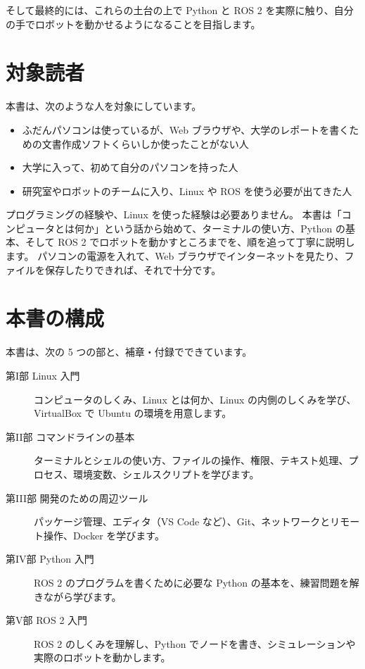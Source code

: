 そして最終的には、これらの土台の上で Python と ROS 2 を実際に触り、自分の手でロボットを動かせるようになることを目指します。

\section*{対象読者}

本書は、次のような人を対象にしています。

\begin{itemize}
  \item ふだんパソコンは使っているが、Web ブラウザや、大学のレポートを書くための文書作成ソフトくらいしか使ったことがない人
  \item 大学に入って、初めて自分のパソコンを持った人
  \item 研究室やロボットのチームに入り、Linux や ROS を使う必要が出てきた人
\end{itemize}

プログラミングの経験や、Linux を使った経験は必要ありません。
本書は「コンピュータとは何か」という話から始めて、ターミナルの使い方、Python の基本、そして ROS 2 でロボットを動かすところまでを、順を追って丁寧に説明します。
パソコンの電源を入れて、Web ブラウザでインターネットを見たり、ファイルを保存したりできれば、それで十分です。

\section*{本書の構成}

本書は、次の 5 つの部と、補章・付録でできています。

\begin{description}
  \item[第I部 Linux 入門] コンピュータのしくみ、Linux とは何か、Linux の内側のしくみを学び、VirtualBox で Ubuntu の環境を用意します。
  \item[第II部 コマンドラインの基本] ターミナルとシェルの使い方、ファイルの操作、権限、テキスト処理、プロセス、環境変数、シェルスクリプトを学びます。
  \item[第III部 開発のための周辺ツール] パッケージ管理、エディタ（VS Code など）、Git、ネットワークとリモート操作、Docker を学びます。
  \item[第IV部 Python 入門] ROS 2 のプログラムを書くために必要な Python の基本を、練習問題を解きながら学びます。
  \item[第V部 ROS 2 入門] ROS 2 のしくみを理解し、Python でノードを書き、シミュレーションや実際のロボットを動かします。
\end{description}

